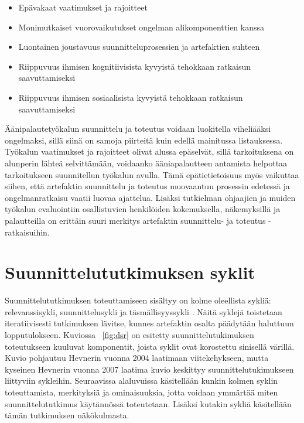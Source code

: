 \documentclass[utf8]{gradu3}
\begin{document}
\begin{itemize}
  \item Epävakaat vaatimukset ja rajoitteet
  \item Monimutkaiset vuorovaikutukset ongelman alikomponenttien kanssa
  \item Luontainen joustavuus suunnitteluprosessien ja artefaktien suhteen
  \item Riippuvuus ihmisen kognitiivisista kyvyistä tehokkaan ratkaisun saavuttamiseksi
  \item Riippuvuus ihmisen sosiaalisista kyvyistä tehokkaan ratkaisun saavuttamiseksi
\end{itemize}

Äänipalautetyökalun suunnittelu ja toteutus voidaan luokitella viheliääksi ongelmaksi, sillä siinä on samoja piirteitä kuin edellä mainitussa listauksessa. Työkalun vaatimukset ja rajoitteet olivat alussa epäselvät, sillä tarkoituksena on alunperin lähteä selvittämään, voidaanko ääniapalautteen antamista helpottaa tarkoitukseen suunnitellun työkalun avulla. Tämä epätietietoisuus myös vaikuttaa siihen, että artefaktin suunnittelu ja toteutus muovaantuu prosessin edetessä ja ongelmanratkaisu vaatii luovaa ajattelua. Lisäksi tutkielman ohjaajien ja muiden työkalun evaluointiin osallistuvien henkilöiden kokemuksella, näkemyksillä ja palautteilla on erittäin suuri merkitys artefaktin suunnittelu- ja toteutus -ratkaisuihin.

%

\section{Suunnittelututkimuksen syklit}

Suunnittelututkimuksen toteuttamiseen sisältyy on kolme oleellista sykliä: relevanssisykli, suunnittelusykli ja täsmällisyyssykli \parencite[][]{cycles}. Näitä syklejä toistetaan iteratiivisesti tutkimuksen lävitse, kunnes artefaktin osalta päädytään haluttuun lopputulokseen. Kuviossa ~\ref{fig:dsr} on esitetty suunnittelutukimuksen toteutukseen kuuluvat komponentit, joista syklit ovat korostettu sinisellä värillä. Kuvio pohjautuu Hevnerin vuonna 2004 \parencite[][]{hevner2004} laatimaan viitekehykseen, mutta kyseinen Hevnerin vuonna 2007 \parencite[][]{cycles} laatima kuvio keskittyy suunnittelutukimukseen liittyviin sykleihin. Seuraavissa alaluvuissa käsitellään kunkin kolmen syklin toteuttamista, merkityksiä ja ominaisuuksia, jotta voidaan ymmärtää miten suunnittelututkimus käytännössä toteutetaan. Lisäksi kutakin sykliä käsitellään tämän tutkimuksen näkökulmasta.
\end{document}
